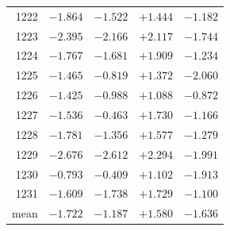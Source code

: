 \begin{table}[p]
\begin{tabular}{rcccc}
1222 & $-1.864$ & $-1.522$ & $+1.444$ & $-1.182$ \\
1223 & $-2.395$ & $-2.166$ & $+2.117$ & $-1.744$ \\
1224 & $-1.767$ & $-1.681$ & $+1.909$ & $-1.234$ \\
1225 & $-1.465$ & $-0.819$ & $+1.372$ & $-2.060$ \\
1226 & $-1.425$ & $-0.988$ & $+1.088$ & $-0.872$ \\
1227 & $-1.536$ & $-0.463$ & $+1.730$ & $-1.166$ \\
1228 & $-1.781$ & $-1.356$ & $+1.577$ & $-1.279$ \\
1229 & $-2.676$ & $-2.612$ & $+2.294$ & $-1.991$ \\
1230 & $-0.793$ & $-0.409$ & $+1.102$ & $-1.913$ \\
1231 & $-1.609$ & $-1.738$ & $+1.729$ & $-1.100$ \\
\midrule
mean & $-1.722$ & $-1.187$ & $+1.580$ & $-1.636$ \\
\bottomrule
\end{tabular}
\end{table}
